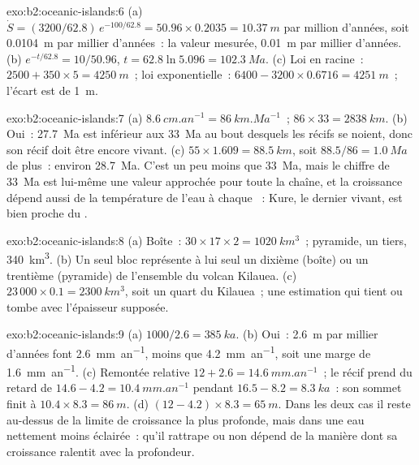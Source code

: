 \begin{solution}{exo:b2:oceanic-islands:6}
(a) $\dot S = (3200/62.8)\,e^{-100/62.8} = 50.96\times0.2035 = \qty{10.37}{m}$ par million d'années,
soit \qty{0.0104}{m} par millier d'années~: la valeur mesurée, \qty{0.01}{m} par millier d'années. (b) $e^{-t/62.8}
= 10/50.96$, $t = 62.8\ln5.096 = \qty{102.3}{Ma}$. (c) Loi en racine~: $2500 + 350\times5 =
\qty{4250}{m}$~; loi exponentielle~: $6400 - 3200\times0.6716 = \qty{4251}{m}$~; l'écart est de
\qty{1}{m}.
\end{solution}

\begin{solution}{exo:b2:oceanic-islands:7}
(a) $\qty{8.6}{cm.an^{-1}} = \qty{86}{km.Ma^{-1}}$~; $86\times33 = \qty{2838}{km}$. (b) Oui~:
\qty{27.7}{Ma} est inférieur aux \qty{33}{Ma} au bout desquels les récifs se noient, donc son récif
doit être encore vivant. (c) $55\times1.609 = \qty{88.5}{km}$, soit $88.5/86 = \qty{1.0}{Ma}$ de
plus~: environ \qty{28.7}{Ma}. C'est un peu moins que \qty{33}{Ma}, mais le chiffre de \qty{33}{Ma}
est lui-même une valeur approchée pour toute la chaîne, et la croissance dépend aussi de la température
de l'eau à chaque ~: Kure, le dernier  vivant, est bien proche du .
\end{solution}

\begin{solution}{exo:b2:oceanic-islands:8}
(a) Boîte~: $30\times17\times2 = \qty{1020}{km^3}$~; pyramide, un tiers, \qty{340}{km^3}. (b) Un seul bloc représente à lui seul un dixième (boîte) ou un trentième (pyramide)
de l'ensemble du volcan Kilauea. (c) $23\,000\times
0.1 = \qty{2300}{km^3}$, soit un quart du Kilauea~; une estimation qui tient ou tombe avec
l'épaisseur supposée.
\end{solution}

\begin{solution}{exo:b2:oceanic-islands:9}
(a) $1000/2.6 = \qty{385}{ka}$. (b) Oui~: \qty{2.6}{m} par millier d'années font
\qty{2.6}{mm.an^{-1}}, moins que \qty{4.2}{mm.an^{-1}}, soit une marge de \qty{1.6}{mm.an^{-1}}.
(c) Remontée relative $12 + 2.6 = \qty{14.6}{mm.an^{-1}}$~; le récif prend du retard de $14.6 - 4.2 =
\qty{10.4}{mm.an^{-1}}$ pendant $16.5 - 8.2 = \qty{8.3}{ka}$~: son sommet finit à $10.4\times8.3 =
\qty{86}{m}$. (d) $(12 - 4.2)\times8.3 = \qty{65}{m}$. Dans les deux cas il reste au-dessus de la limite de croissance la plus profonde, mais
dans une eau nettement moins éclairée~: qu'il rattrape ou non dépend de la manière dont sa croissance
ralentit avec la profondeur.
\end{solution}

